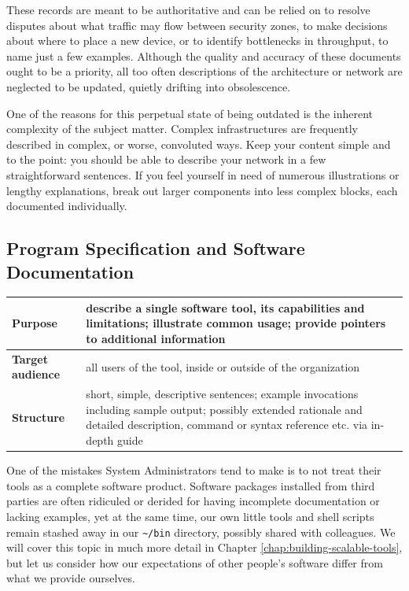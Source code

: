 These records are meant to be authoritative and can be
relied on to resolve disputes about what traffic may
flow between security zones, to make decisions about
where to place a new device, or to identify
bottlenecks in throughput, to name just a few
examples.  Although the quality and accuracy of these
documents ought to be a priority, all too often
descriptions of the architecture or network are
neglected to be updated, quietly drifting into
obsolescence.

One of the reasons for this perpetual state of being
outdated is the inherent complexity of the subject
matter.  Complex infrastructures are frequently
described in complex, or worse, convoluted ways.  Keep
your content simple and to the point: you should be
able to describe your network in a few straightforward
sentences.  If you feel yourself in need of numerous
illustrations or lengthy explanations, break out
larger components into less complex blocks,
each documented individually.

\subsection{Program Specification and Software Documentation}
\label{documentation:types:program-specification}

\vspace{.25in}
\begin{tabular}[ht]{ l p{}}
	\hline
	{\bf Purpose} & describe a single software tool, its capabilities and limitations; \newline
			illustrate common usage; \newline
			provide pointers to additional information \\
	\hline
	{\bf Target audience} & all users of the tool, inside or outside of the organization \\
	\hline
	{\bf Structure} &  short, simple, descriptive sentences; \newline
				example invocations including sample output; \newline
				possibly extended rationale and detailed
				description, command or syntax reference
				etc. via in-depth guide \\
	\hline
\end{tabular}
\vspace{.25in}

One of the mistakes System Administrators tend to make
is to not treat their tools as a complete software
product.  Software packages installed from third
parties are often ridiculed or derided for having
incomplete documentation or lacking examples, yet at
the same time, our own little tools and shell scripts
remain stashed away in our {\tt \~{}/bin} directory,
possibly shared with colleagues.  We will cover this
topic in much more detail in Chapter
\ref{chap:building-scalable-tools}, but let us
consider how our expectations of other people's
software differ from what we provide ourselves.

